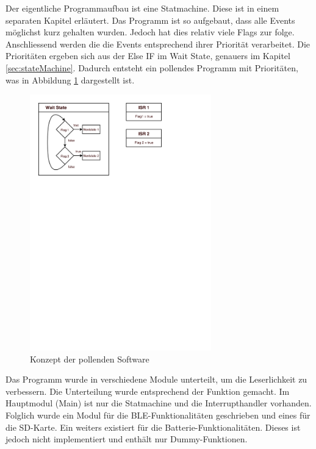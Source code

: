 Der eigentliche Programmaufbau ist eine Statmachine. Diese ist in einem separaten Kapitel erläutert. Das Programm ist so aufgebaut, dass alle Events möglichst kurz gehalten wurden. Jedoch hat dies relativ viele Flags zur folge. Anschliessend werden die die Events entsprechend ihrer Priorität verarbeitet. Die Prioritäten ergeben sich aus der Else IF im Wait State, genauers im Kapitel \ref{sec:stateMachine}. Dadurch entsteht ein pollendes Programm mit Prioritäten, was in Abbildung \ref{fig:Software_approach} dargestellt ist.

\begin{figure}[htbp!!!!]
	\centering
	\includegraphics[width=0.7\textwidth]{Data/Software_Pollend.pdf}
	\caption[Software:Pollend]{Konzept der pollenden Software}
	\label{fig:Software_approach}
\end{figure}

Das Programm wurde in verschiedene Module unterteilt, um die Leserlichkeit zu verbessern. Die Unterteilung wurde entsprechend der Funktion gemacht. Im Hauptmodul (Main) ist nur die Statmachine und die Interrupthandler vorhanden. Folglich wurde ein Modul für die BLE-Funktionalitäten geschrieben und eines für die SD-Karte. Ein weiters existiert für die Batterie-Funktionalitäten. Dieses ist jedoch nicht implementiert und enthält nur Dummy-Funktionen.






